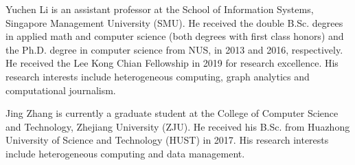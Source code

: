 \documentclass[10pt,journal,compsoc]{IEEEtran}
\begin{document}
\maketitle
\IEEEdisplaynontitleabstractindextext
\IEEEpeerreviewmaketitle











%





\begin{IEEEbiography}
	{Yuchen Li} is an assistant professor at the School of Information Systems, Singapore Management University (SMU).
	He received the double B.Sc. degrees in applied math and computer science (both degrees with first class honors)
	and the Ph.D. degree in computer science from NUS, in 2013 and 2016, respectively. He received the Lee Kong Chian Fellowship in 2019 for research excellence.
	His research interests include heterogeneous computing, graph analytics and computational journalism.
\end{IEEEbiography}

\begin{IEEEbiography}
	{Jing Zhang} is currently a graduate student at the College of Computer Science and Technology, Zhejiang University (ZJU). He received his B.Sc. from Huazhong University of Science and Technology (HUST) in 2017. His research interests include heterogeneous computing and data management.
\end{IEEEbiography}
\end{document}
